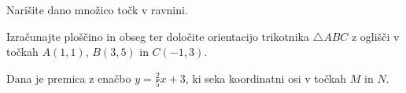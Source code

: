 \documentclass[addpoints]{exam}
\begin{document}
\begin{questions}


    \question
    Narišite dano množico točk v ravnini.
    \begin{parts}
        \part[4]
        $(3,8)\times (-\infty,2]$


        \part[4]
        $\left\{(x,y)\in\mathbb{R}^2 \mid (y=-2x+1)\land (y>-3)\right\} $

        \part[4]
        $(3,6)\times\{3,4,5\}$

    \end{parts}
    
    

    \question[6]
    Izračunajte ploščino in obseg ter določite orientacijo trikotnika $\triangle ABC$ z oglišči v točkah $A(1,1)$, $B(3,5)$ in $C(-1,3)$.
    
        


    \question
    Dana je premica z enačbo $y=\frac{2}{5}x+3$, ki seka koordinatni osi v točkah $M$ in $N$.

\end{questions}
\end{document}
